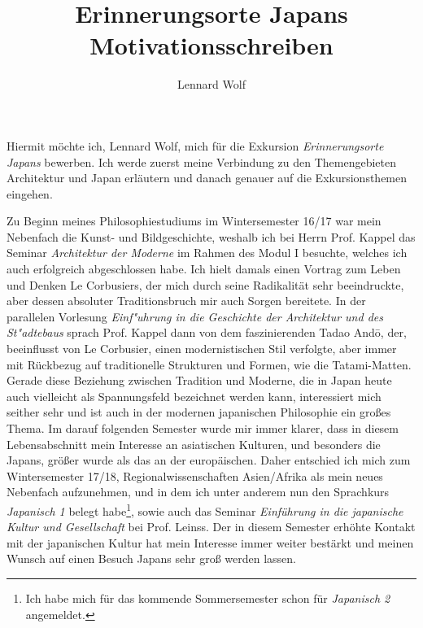 \documentclass[a4paper]{article}
\date{\vspace{-2ex}}
\begin{document}
\title{Erinnerungsorte Japans\\Motivationsschreiben\vspace{-0.5ex}}

\author{Lennard Wolf}

\maketitle

\noindent Hiermit möchte ich, Lennard Wolf, mich für die Exkursion \emph{Erinnerungsorte Japans} bewerben. Ich werde zuerst meine Verbindung zu den Themengebieten Architektur und Japan erläutern und danach genauer auf die Exkursionsthemen eingehen. 

Zu Beginn meines Philosophiestudiums im Wintersemester 16/17 war mein Nebenfach die Kunst- und Bildgeschichte, weshalb ich bei Herrn Prof. Kappel das Seminar \emph{Architektur der Moderne} im Rahmen des Modul I besuchte, welches ich auch erfolgreich abgeschlossen habe. Ich hielt damals einen Vortrag zum Leben und Denken Le Corbusiers, der mich durch seine Radikalität sehr beeindruckte, aber dessen absoluter Traditionsbruch mir auch Sorgen bereitete. In der parallelen Vorlesung \emph{Einf"uhrung in die Geschichte der Architektur und des St"adtebaus} sprach Prof. Kappel dann von dem faszinierenden Tadao Andō, der, beeinflusst von Le Corbusier, einen modernistischen Stil verfolgte, aber immer mit Rückbezug auf traditionelle Strukturen und Formen, wie die Tatami-Matten. Gerade diese Beziehung zwischen Tradition und Moderne, die in Japan heute auch vielleicht als Spannungsfeld bezeichnet werden kann, interessiert mich seither sehr und ist auch in der modernen japanischen Philosophie ein großes Thema. Im darauf folgenden Semester wurde mir immer klarer, dass in diesem Lebensabschnitt mein Interesse an asiatischen Kulturen, und besonders die Japans, größer wurde als das an der europäischen. Daher entschied ich mich zum Wintersemester 17/18, Regionalwissenschaften Asien/Afrika als mein neues Nebenfach aufzunehmen, und in dem ich unter anderem nun den Sprachkurs \emph{Japanisch 1} belegt habe\footnote{Ich habe mich für das kommende Sommersemester schon für \emph{Japanisch 2} angemeldet.}, sowie auch das Seminar \emph{Einführung in die japanische Kultur und Gesellschaft} bei Prof. Leinss. Der in diesem Semester erhöhte Kontakt mit der japanischen Kultur hat mein Interesse immer weiter bestärkt und meinen Wunsch auf einen Besuch Japans sehr groß werden lassen.
\end{document}

